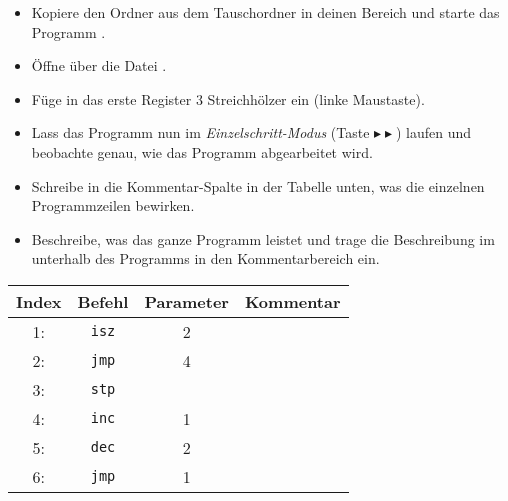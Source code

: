 \documentclass[10pt, a4paper, ngerman]{arbeitsblatt}
\begin{document}
\ReiheTitel

\begin{aufgabe}[icon=\iconComputer]
	\label{aufg:afg1}
	\begin{itemize}
		\item Kopiere den Ordner  aus dem Tauschordner in deinen Bereich und starte das Programm .
		\item Öffne über  die Datei .
		\item Füge in das erste Register 3 Streichhölzer ein (linke Maustaste).
		\item Lass das Programm nun im \emph{Einzelschritt-Modus} (Taste $\blacktriangleright\blacktriangleright$) laufen und beobachte genau, wie das Programm abgearbeitet wird.
	\end{itemize}

	\bigskip
	\begin{itemize}
		\item Schreibe in die Kommentar-Spalte in der Tabelle unten, was die einzelnen Programmzeilen bewirken.
		\item Beschreibe, was das ganze Programm leistet und trage die Beschreibung im  unterhalb des Programms in den Kommentarbereich ein.
	\end{itemize}

	\begin{center}
	\begin{tabularx}{.8\textwidth}{|c|c|c|X|}\hline
		\rowcolor{ab.tabelle.kopf.hg}
		Index & Befehl & Parameter & Kommentar \\\hline
		1: & \texttt{isz} & 2 & \Zeilenabstand\\\hline
		2: & \texttt{jmp} & 4 & \Zeilenabstand\\\hline
		3: & \texttt{stp} &   & \Zeilenabstand\\\hline
		4: & \texttt{inc} & 1 & \Zeilenabstand\\\hline
		5: & \texttt{dec} & 2 & \Zeilenabstand\\\hline
		6: & \texttt{jmp} & 1 & \Zeilenabstand\\\hline
	\end{tabularx}
	\end{center}
\end{aufgabe}
\end{document}
